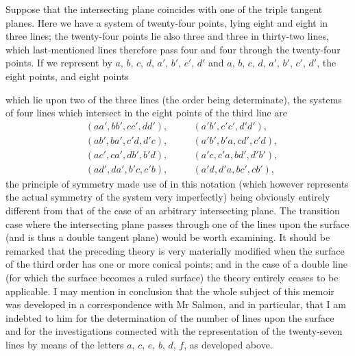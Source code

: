 \documentclass[11pt,a4paper]{article}
\theoremstyle{definition}
\begin{document}
\newpage

\setcounter{page}{455}

Suppose that the intersecting plane coincides with one of the triple tangent planes. Here we have a system of twenty-four points, lying eight and eight in three lines; the twenty-four points lie also three and three in thirty-two lines, which last-mentioned lines therefore pass four and four through the twenty-four points. If we represent by $a$, $b$, $c$, $d$, $a'$, $b'$, $c'$, $d'$ and $a$, $b$, $c$, $d$, $a'$, $b'$, $c'$, $d'$, the eight points, and eight points

\newpage

\setcounter{page}{456}

which lie upon two of the three lines (the order being determinate), the systems of four lines which intersect in the eight points of the third line are
\begin{align*}
&(aa', bb', cc', dd'), \quad &&(a'b', c'c', d'd'), \\
&(ab', ba', c'd, d'c), \quad &&(a'b', b'a, cd', c'd), \\
&(ac', ca', db', b'd), \quad &&(a'c, c'a, bd', d'b'), \\
&(ad', da', b'c, c'b), \quad &&(a'd, d'a, bc', cb'),
\end{align*}
the principle of symmetry made use of in this notation (which however represents the actual symmetry of the system very imperfectly) being obviously entirely different from that of the case of an arbitrary intersecting plane. The transition case where the intersecting plane passes through one of the lines upon the surface (and is thus a double tangent plane) would be worth examining. It should be remarked that the preceding theory is very materially modified when the surface of the third order has one or more conical points; and in the case of a double line (for which the surface becomes a ruled surface) the theory entirely ceases to be applicable. I may mention in conclusion that the whole subject of this memoir was developed in a correspondence with Mr Salmon, and in particular, that I am indebted to him for the determination of the number of lines upon the surface and for the investigations connected with the representation of the twenty-seven lines by means of the letters $a$, $c$, $e$, $b$, $d$, $f$, as developed above.



\newpage
\end{document}

